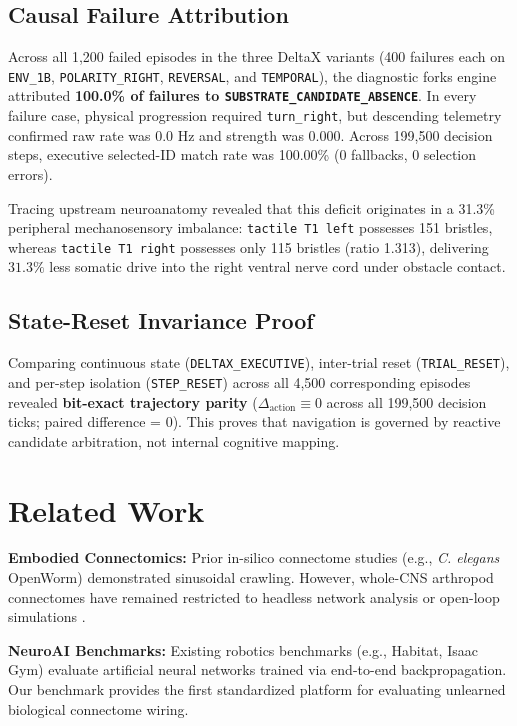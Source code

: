 \documentclass{article}
\begin{document}
\subsection{Causal Failure Attribution}

Across all 1,200 failed episodes in the three DeltaX variants (400 failures each on \texttt{ENV\_1B}, \texttt{POLARITY\_RIGHT}, \texttt{REVERSAL}, and \texttt{TEMPORAL}), the diagnostic forks engine attributed \textbf{100.0\% of failures to \texttt{SUBSTRATE\_CANDIDATE\_ABSENCE}}. In every failure case, physical progression required \texttt{turn\_right}, but descending telemetry confirmed raw rate was $0.0\text{ Hz}$ and strength was $0.000$. Across 199,500 decision steps, executive selected-ID match rate was 100.00\% (0 fallbacks, 0 selection errors).

Tracing upstream neuroanatomy revealed that this deficit originates in a 31.3\% peripheral mechanosensory imbalance: \texttt{tactile T1 left} possesses 151 bristles, whereas \texttt{tactile T1 right} possesses only 115 bristles (ratio 1.313), delivering $31.3\%$ less somatic drive into the right ventral nerve cord under obstacle contact.

\subsection{State-Reset Invariance Proof}

Comparing continuous state (\texttt{DELTAX\_EXECUTIVE}), inter-trial reset (\texttt{TRIAL\_RESET}), and per-step isolation (\texttt{STEP\_RESET}) across all 4,500 corresponding episodes revealed \textbf{bit-exact trajectory parity} ($\Delta_{\text{action}} \equiv 0$ across all 199,500 decision ticks; paired difference = 0). This proves that navigation is governed by reactive candidate arbitration, not internal cognitive mapping.

\section{Related Work}

\textbf{Embodied Connectomics:} Prior in-silico connectome studies (e.g., \textit{C. elegans} OpenWorm) demonstrated sinusoidal crawling. However, whole-CNS arthropod connectomes have remained restricted to headless network analysis or open-loop simulations \cite{pugliese2025whole}. 

\textbf{NeuroAI Benchmarks:} Existing robotics benchmarks (e.g., Habitat, Isaac Gym) evaluate artificial neural networks trained via end-to-end backpropagation. Our benchmark provides the first standardized platform for evaluating unlearned biological connectome wiring.
\end{document}
